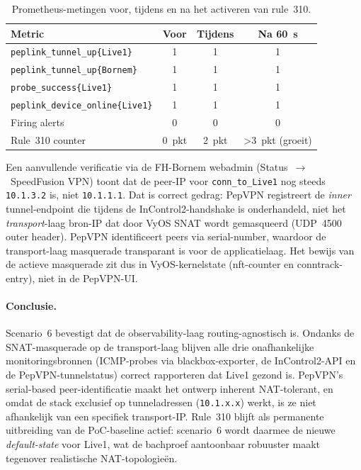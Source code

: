 \begin{table}[H]
  \centering
  \caption[Metingen scenario 6]{Prometheus-metingen voor, tijdens en na het activeren van rule~310.}
  \label{tab:scenario-6}
  \begin{tabular}{l c c c}
    \hline
    \textbf{Metric} & \textbf{Voor} & \textbf{Tijdens} & \textbf{Na 60~s} \\
    \hline
    \texttt{peplink\_tunnel\_up\{Live1\}}     & 1 & 1 & 1 \\
    \texttt{peplink\_tunnel\_up\{Bornem\}}    & 1 & 1 & 1 \\
    \texttt{probe\_success\{Live1\}}          & 1 & 1 & 1 \\
    \texttt{peplink\_device\_online\{Live1\}} & 1 & 1 & 1 \\
    Firing alerts                               & 0 & 0 & 0 \\
    Rule~310 counter                           & 0~pkt & 2~pkt & \textgreater 3~pkt (groeit) \\
    \hline
  \end{tabular}
\end{table}

Een aanvullende verificatie via de FH-Bornem webadmin (Status~$\rightarrow$~SpeedFusion VPN) toont dat de peer-IP voor \texttt{conn\_to\_Live1} nog steeds \texttt{10.1.3.2} is, niet \texttt{10.1.1.1}. Dat is correct gedrag: PepVPN registreert de \emph{inner} tunnel-endpoint die tijdens de InControl2-handshake is onderhandeld, niet het \emph{transport}-laag bron-IP dat door VyOS SNAT wordt gemasqueerd (UDP~4500 outer header). PepVPN identificeert peers via serial-number, waardoor de transport-laag masquerade transparant is voor de applicatielaag. Het bewijs van de actieve masquerade zit dus in VyOS-kernelstate (nft-counter en conntrack-entry), niet in de PepVPN-UI.

\paragraph{Conclusie.} Scenario~6 bevestigt dat de observability-laag routing-agnostisch is. Ondanks de SNAT-masquerade op de transport-laag blijven alle drie onafhankelijke monitoringsbronnen (ICMP-probes via blackbox-exporter, de InControl2-API en de PepVPN-tunnelstatus) correct rapporteren dat Live1 gezond is. PepVPN's serial-based peer-identificatie maakt het ontwerp inherent NAT-tolerant, en omdat de stack exclusief op tunneladressen (\texttt{10.1.x.x}) werkt, is ze niet afhankelijk van een specifiek transport-IP. Rule~310 blijft als permanente uitbreiding van de PoC-baseline actief: scenario~6 wordt daarmee de nieuwe \emph{default-state} voor Live1, wat de bachproef aantoonbaar robuuster maakt tegenover realistische NAT-topologieën.

